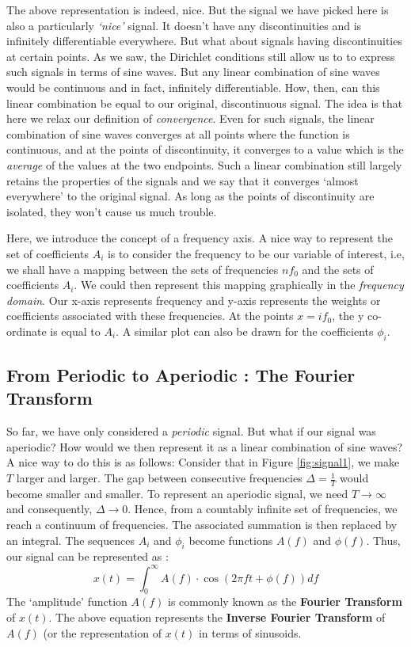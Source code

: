 \documentclass{article}
\theoremstyle{definition}
\begin{document}
	 The above representation is indeed, nice. But the signal we have picked here is also a particularly \textit{`nice'} signal. It doesn't have any discontinuities and is infinitely differentiable everywhere. But what about signals having discontinuities at certain points. As we saw, the Dirichlet conditions still allow us to to express such signals in terms of sine waves. But any linear combination of sine waves would be continuous and in fact, infinitely differentiable. How, then, can this linear combination be equal to our original, discontinuous signal. The idea is that here we relax our definition of \textit{convergence}. Even for such signals, the linear combination of sine waves converges at all points where the function is continuous, and at the points of discontinuity, it converges to a value which is the \textit{average} of the values at the two endpoints. Such a linear combination still largely retains the properties of the signals and we say that it converges `almost everywhere' to the original signal. As long as the points of discontinuity are isolated, they won't cause us much trouble. \smallskip
	 
	 Here, we introduce the concept of a frequency axis. A nice way to represent the set of coefficients $A_i$ is to consider the frequency to be our variable of interest, i.e, we shall have a mapping between the sets of frequencies $nf_0$ and the sets of coefficients $A_i$. We could then represent this mapping graphically in the \textit{frequency domain}. Our x-axis represents frequency and y-axis represents the weights or coefficients associated with these frequencies. At the points $x= if_0$, the y co-ordinate is equal to $A_i$. A similar plot can also be drawn for the coefficients $\phi_i$. 
	 
	 \subsection{From Periodic to Aperiodic : The Fourier Transform}
	 So far, we have only considered a \textit{periodic} signal. But what if our signal was aperiodic? How would we then represent it as a linear combination of sine waves? A nice way to do this is as follows: 
	 Consider that in Figure \ref{fig:signal1}, we make $T$ larger and larger. The gap between consecutive frequencies $\Delta = \frac{1}{T}$ would become smaller and smaller. To represent an aperiodic signal, we need $T \rightarrow \infty$ and consequently, $\Delta \rightarrow 0$. Hence, from a countably infinite set of frequencies, we reach a continuum of frequencies. The associated summation is then replaced by an integral. The sequences $A_i$ and $\phi_i$ become functions $A(f)$ and $\phi(f)$. Thus, our signal can be represented as : 
	 \[x(t) = \int_{0}^{\infty} A(f) \cdot \cos(2\pi ft+\phi(f)) df \]
	 The `amplitude' function $A(f)$ is commonly known as the \textbf{Fourier Transform} of $x(t)$. The above equation represents the \textbf{Inverse Fourier Transform} of $A(f)$ (or the representation of $x(t)$ in terms of sinusoids. 
	 
\end{document}
